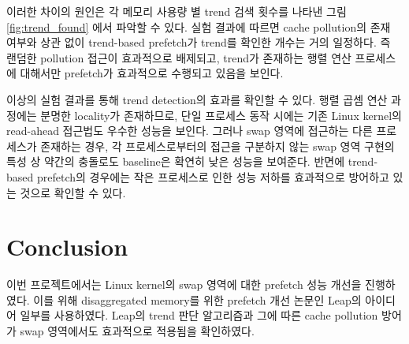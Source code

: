 \documentclass[conference,11pt]{IEEEtran}
\begin{document}
\begin{CJK}{UTF8}{}
    이러한 차이의 원인은 각 메모리 사용량 별 trend 검색 횟수를 나타낸 그림 \ref{fig:trend_found} 에서 파악할 수 있다. 실험 결과에 따르면 cache pollution의 존재 여부와 상관 없이 trend-based prefetch가 trend를 확인한 개수는 거의 일정하다. 즉 랜덤한 pollution 접근이 효과적으로 배제되고, trend가 존재하는 행렬 연산 프로세스에 대해서만 prefetch가 효과적으로 수행되고 있음을 보인다.

    이상의 실험 결과를 통해 trend detection의 효과를 확인할 수 있다. 행렬 곱셈 연산 과정에는 분명한 locality가 존재하므로, 단일 프로세스 동작 시에는 기존 Linux kernel의 read-ahead 접근법도 우수한 성능을 보인다. 그러나 swap 영역에 접근하는 다른 프로세스가 존재하는 경우, 각 프로세스로부터의 접근을 구분하지 않는 swap 영역 구현의 특성 상 약간의 충돌로도 baseline은 확연히 낮은 성능을 보여준다. 반면에 trend-based prefetch의 경우에는 작은 프로세스로 인한 성능 저하를 효과적으로 방어하고 있는 것으로 확인할 수 있다.

    \section{Conclusion} \label{sec:conclusion}

    이번 프로젝트에서는 Linux kernel의 swap 영역에 대한 prefetch 성능 개선을 진행하였다. 이를 위해 disaggregated memory를 위한 prefetch 개선 논문인 Leap의 아이디어 일부를 사용하였다. Leap의 trend 판단 알고리즘과 그에 따른 cache pollution 방어가 swap 영역에서도 효과적으로 적용됨을 확인하였다.

    
    

\end{CJK} %
\end{document}
